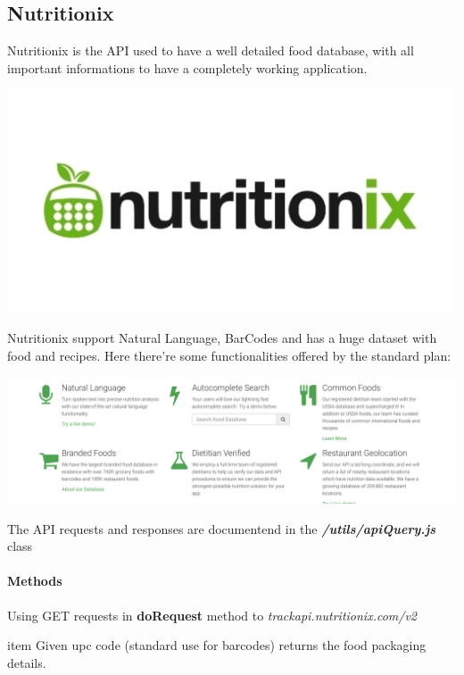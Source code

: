 \documentclass[12pt,hidelinks]{article}
\begin{document}
	\subsection{Nutritionix}\label{subsec:mathenvironments}
		Nutritionix \cite{Nutritionix} is the API used to have a well detailed food database, with all important informations 
		to have a completely working application.
		\begin{center}

			\includegraphics[scale=0.35]{Nutritionix}
		\end{center}
		Nutritionix support Natural Language, BarCodes and has a huge dataset with food and recipes. Here there're some 
		functionalities offered by the standard plan:
		\begin{center}

			\includegraphics[scale=0.3]{Nutritionix detail}
		\end{center}
		The API requests and responses are documentend in the \textbf{\emph{/utils/apiQuery.js}} class

        \paragraph{Methods}
     Using GET requests in \textbf{doRequest} method to \emph{trackapi.nutritionix.com/v2}
		\begin{docCommand}{item}{}
			Given upc code (standard use for barcodes) returns the food packaging details.
	\end{docCommand}
\end{document}

